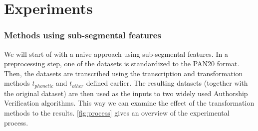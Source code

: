 \chapter{Experiments}\label{experiments}
\subsection{Methods using sub-segmental features}
We will start of with a naive approach using sub-segmental features.
In a preprocessing step, one of the datasets is standardized to the PAN20 format.
Then, the datasets are transcribed using the transcription and transformation methods $t_{phonetic}$ and $t_{other}$ defined earlier.
The resulting datasets (together with the original dataset) are then used as the inputs to two widely used Authorship Verification algorithms.
This way we can examine the effect of the transformation methods to the results.
\ref{fig:process} gives an overview of the experimental process.
%

